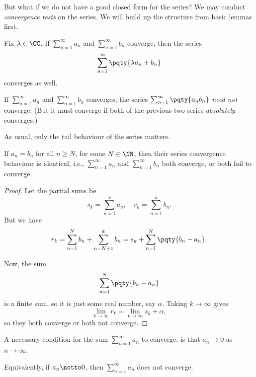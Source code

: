 But what if we do not have a good closed form for the series? We may conduct \emph{convergence tests} on the series. We will build up the structure from basic lemmas first.

\begin{lemma}
    \label{lem:seq-linear-combination-series}%
    Fix \(\lambda \in \CC\). If \(\sum_{n = 1}^{\infty} a_n\) and \(\sum_{n = 1}^{\infty} b_n\) converge, then the series
    \[
        \sum_{n = 1}^{\infty} \pqty{\lambda a_n + b_n}
    \]
    converges as well.
\end{lemma}

\begin{remark}
    If \(\sum_{n = 1}^{\infty} a_n\) and \(\sum_{n = 1}^{\infty} b_n\) converges, the series \(\sum_{n = 1}^{\infty} \pqty{a_n b_n}\) \emph{need not} converge. (But it must converge if both of the previous two series \textit{absolutely} converges.)
\end{remark}

As usual, only the tail behaviour of the series matters.

\begin{lemma}
    \label{lem:seq-series-convergence-tail}%
    If \(a_n = b_n\) for all \(n \geq N\), for some \(N \in \NN\), then their series convergence behaviour is identical, i.e., \(\sum_{n = 1}^{\infty} a_n\) and \(\sum_{n = 1}^{\infty} b_n\) both converge, or both fail to converge.
\end{lemma}

\begin{proof}
    Let the partial sums be
    \[
        s_k = \sum_{n = 1}^{k} a_n, \quad r_k = \sum_{n = 1}^{k} b_n.
    \]
    But we have
    \[
        r_k = \sum_{n = 1}^{N} b_n + \sum_{n = N + 1}^{k} b_n = s_{k} + \sum_{n = 1}^{N} \pqty{b_n - a_n}.
    \]

    Now, the sum
    \[
        \sum_{n = 1}^{N} \pqty{b_n - a_n}
    \]
    is a finite sum, so it is just some real number, say \(\alpha\). Taking \(k \to \infty\) gives
    \[
        \lim_{k \to \infty} r_k = \lim_{k \to \infty} s_k + \alpha,
    \]
    so they both converge or both not converge.
\end{proof}

\begin{proposition}
    \label{prop:ser-test-nth-term}%
    A necessary condition for the sum \(\sum_{n = 1}^{\infty} a_n\) to  converge, is that \(a_n \to 0\) as \(n \to \infty\).

    Equivalently, if \(a_n \notto 0\), then \(\sum_{n = 1}^{\infty} a_n\) does not converge.
\end{proposition}

